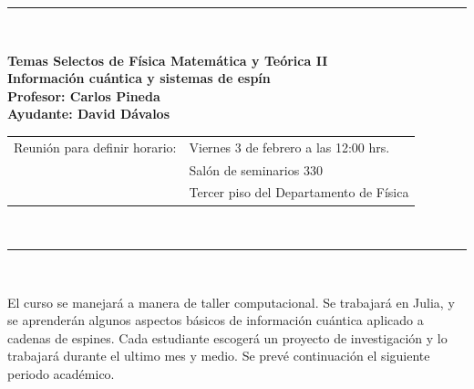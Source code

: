 \documentclass[pdftex,12pt, letterpaper]{report}
\newcommand{\HRule}{\rule{\linewidth}{0.5mm}}
\begin{document}
\begin{titlepage}

\begin{center}




\pagecolor{backgroundcolor}
\HRule \\[0.0cm]
{ \Large \bfseries 
Temas Selectos de Física Matemática y Teórica II
\\[.5cm]
\Huge
Información cuántica y sistemas de espín
\\ \Large Profesor: Carlos Pineda
\\ \Large Ayudante: David Dávalos
\\[.5cm]
\Large
\begin{tabular}{rl}
Reunión para definir horario: & Viernes 3 de febrero a las 12:00 hrs.\\
& Salón de seminarios 330\\
& Tercer piso del Departamento de Física
\end{tabular}
}\\[0.4cm]
\HRule \\[1.0cm]

\large 

\parbox{.8\textwidth}{
El curso se manejará a manera de taller computacional.  Se trabajará en Julia,
y se aprenderán algunos aspectos básicos de información cuántica aplicado a
cadenas de espines.  Cada estudiante escogerá un proyecto de investigación y lo
trabajará durante el ultimo mes y medio.  Se prevé continuación el siguiente
periodo académico.
}\\[1cm]




\end{center}
\end{titlepage}
\end{document}
